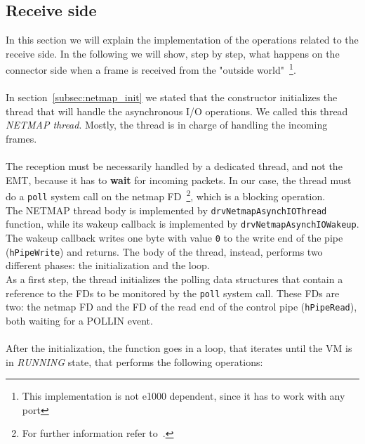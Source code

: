 \documentclass[a4paper, 12pt, titlepage]{report}
\begin{document}
\subsection{Receive side} \label{subsec:netmap_recv}
In this section we will explain the implementation of the operations related to the receive side. In the following we will show, step by step, what happens on the connector side when a frame is received from the "outside world"~\footnote{This implementation is not e1000 dependent, since it has to work with any port}.
\\
\\
In section~\ref{subsec:netmap_init} we stated that the constructor initializes the thread that will handle the asynchronous I/O operations. We called this thread \textit{NETMAP thread}. Mostly, the thread is in charge of handling the incoming frames.
\\
\\
The reception must be necessarily handled by a dedicated thread, and not the EMT, because it has to \textbf{wait} for incoming packets. In our case, the thread must do a \texttt{poll} system call on the netmap FD~\footnote{For further information refer to~\cite{netmap}.}, which is a blocking operation.
\\
The NETMAP thread body is implemented by \texttt{drvNetmapAsynchIOThread} function, while its wakeup callback is implemented by \texttt{drvNetmapAsynchIOWakeup}. The wakeup callback writes one byte with value \texttt{0} to the write end of the pipe (\texttt{hPipeWrite}) and returns. The body of the thread, instead, performs two different phases: the initialization and the loop.
\\
As a first step, the thread initializes the polling data structures that contain a reference to the FDs to be monitored by the \texttt{poll} system call. These FDs are two: the netmap FD and the FD of the read end of the control pipe (\texttt{hPipeRead}), both waiting for a POLLIN event.
\\
\\
After the initialization, the function goes in a loop, that iterates until the VM is in \textit{RUNNING} state, that performs the following operations:
\end{document}

